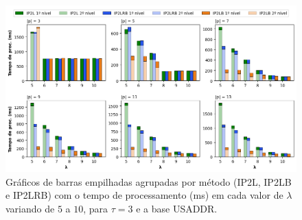 \begin{figure} [h]
    \centering
    \includegraphics[width=1.0\textwidth]{figures/methods_processing_time_usaddr_3.png}
    \caption{Gráficos de barras empilhadas agrupadas por método (IP2L, IP2LB e IP2LRB) com o tempo de processamento (ms) em cada valor de $\lambda$ variando de $5$ a $10$, para $\tau=3$ e a base USADDR.}
    \label{fig:methods_processing_time_usaddr_3}
\end{figure}


